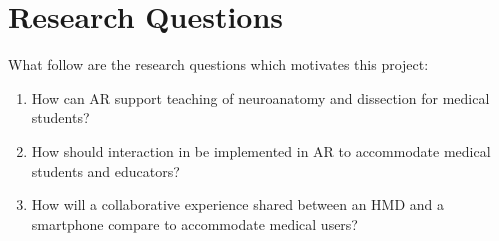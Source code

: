 
\section{Research Questions}
What follow are the research questions which motivates this project: \\

\noindent

\begin{enumerate}[label=\textbf{RQ\arabic*:}, left=\parindent]

    \item How can AR support teaching of neuroanatomy and dissection for medical students?

    \item How should interaction in be implemented in AR to accommodate medical students and educators?
    \item How will a collaborative experience shared between an HMD and a smartphone compare to accommodate medical users?

\end{enumerate}



